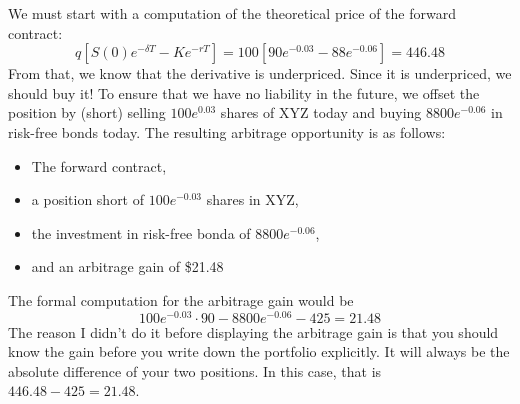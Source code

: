 \documentclass{ximera}
\begin{document}
\begin{solution}
We must start with a computation of the theoretical price of the forward contract:
	\begin{equation*}
	q[S(0)e^{-\delta T}-Ke^{-rT}]=100[90e^{-0.03}-88e^{-0.06}]=446.48
	\end{equation*}
From that, we know that the derivative is underpriced. Since it is underpriced, we should buy it! To ensure that we have no liability in the future, we offset the position by (short) selling $100e^{0.03}$ shares of XYZ today and buying $8800e^{-0.06}$ in risk-free bonds today. The resulting arbitrage opportunity is as follows:
	\begin{itemize}
	\item The forward contract,
	\item a position short of $100e^{-0.03}$ shares in XYZ,
	\item the investment in risk-free bonda of $8800e^{-0.06}$,
	\item and an arbitrage gain of \$21.48
	\end{itemize}
The formal computation for the arbitrage gain would be
	\begin{equation*}
	100e^{-0.03}\cdot 90-8800e^{-0.06}-425=21.48
	\end{equation*}
The reason I didn't do it before displaying the arbitrage gain is that you should know the gain before you write down the portfolio explicitly. It will always be the absolute difference of your two positions. In this case, that is $446.48-425=21.48$.
\end{solution}
\end{document}
